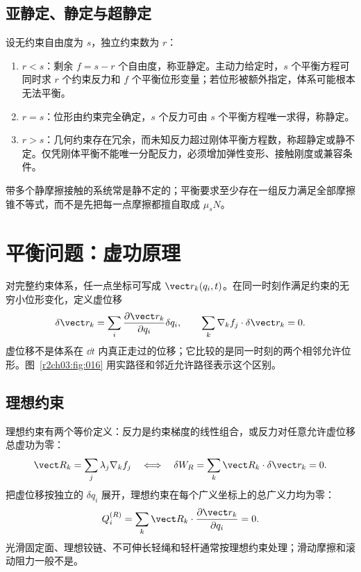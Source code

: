 \subsection{亚静定、静定与超静定}

设无约束自由度为 $s$，独立约束数为 $r$：
\begin{enumerate}
 \item $r<s$：剩余 $f=s-r$ 个自由度，称亚静定。主动力给定时，$s$ 个平衡方程可同时求 $r$ 个约束反力和 $f$ 个平衡位形变量；若位形被额外指定，体系可能根本无法平衡。
 \item $r=s$：位形由约束完全确定，$s$ 个反力可由 $s$ 个平衡方程唯一求得，称静定。
 \item $r>s$：几何约束存在冗余，而未知反力超过刚体平衡方程数，称超静定或静不定。仅凭刚体平衡不能唯一分配反力，必须增加弹性变形、接触刚度或兼容条件。
\end{enumerate}
带多个静摩擦接触的系统常是静不定的；平衡要求至少存在一组反力满足全部摩擦锥不等式，而不是先把每一点摩擦都擅自取成 $\mu_sN$。

\section{平衡问题：虚功原理}
\label{r2ch03:sec:virtual-work}

对完整约束体系，任一点坐标可写成 $\vect r_k(q_i,t)$。在同一时刻作满足约束的无穷小位形变化，定义虚位移
\begin{equation}
 \delta\vect r_k=\sum_i\frac{\partial\vect r_k}{\partial q_i}\delta q_i,\qquad
 \sum_k\nabla_k f_j\cdot\delta\vect r_k=0 .
 \label{r2ch03:eq:020}
\end{equation}
虚位移不是体系在 $\dd t$ 内真正走过的位移；它比较的是同一时刻的两个相邻允许位形。图~\ref{r2ch03:fig:016} 用实路径和邻近允许路径表示这个区别。
\figRealVirtualPath

\subsection{理想约束}

理想约束有两个等价定义：反力是约束梯度的线性组合，或反力对任意允许虚位移总虚功为零：
\begin{equation}
 \vect R_k=\sum_j\lambda_j\nabla_kf_j
 \quad\Longleftrightarrow\quad
 \delta W_R=\sum_k\vect R_k\cdot\delta\vect r_k=0 .
 \label{r2ch03:eq:021}
\end{equation}
把虚位移按独立的 $\delta q_i$ 展开，理想约束在每个广义坐标上的总广义力均为零：
\[
 Q^{(R)}_i=\sum_k\vect R_k\cdot
 \frac{\partial\vect r_k}{\partial q_i}=0 .
\]
光滑固定面、理想铰链、不可伸长轻绳和轻杆通常按理想约束处理；滑动摩擦和滚动阻力一般不是。

